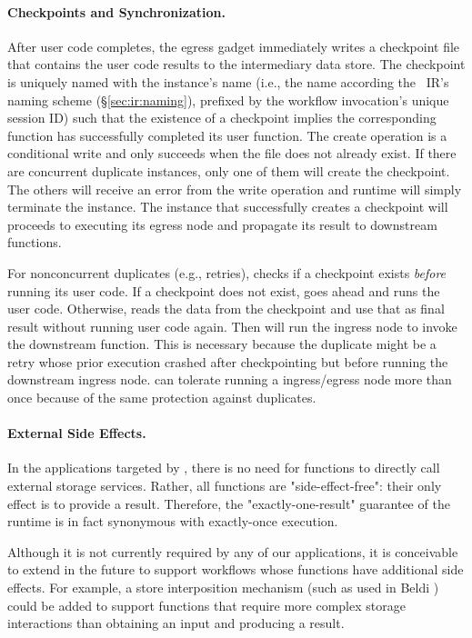 \paragraph{Checkpoints and Synchronization.}
After user code completes, the \name{} egress gadget immediately writes a checkpoint file that contains the user code
results to the intermediary data store. The checkpoint is uniquely named with
the instance's name (i.e., the name according the
\name{}~IR's naming scheme (\S\ref{sec:ir:naming}), prefixed by the workflow
invocation's unique session ID) such that the existence of a checkpoint
implies the corresponding function has successfully completed its user
function. The create operation is a conditional write and only succeeds when
the file does not already exist. If there are concurrent duplicate instances,
only one of them will create the checkpoint. The others will receive an error
from the write operation and \name{} runtime will simply terminate the
instance. The instance that successfully creates a checkpoint will proceeds to
executing its egress node and propagate its result to downstream functions.

For nonconcurrent duplicates (e.g., retries), \name{} checks if a checkpoint
exists \emph{before} running its user code. If a checkpoint does not exist,
\name{} goes ahead and runs the user code. Otherwise, \name{} reads the data
from the checkpoint and use that as final result without running user code
again. Then \name{} will run the ingress node to invoke the downstream function.
This is necessary because the duplicate might be a retry whose prior execution
crashed after checkpointing but before running the downstream ingress node. \name{} can
tolerate running a ingress/egress node more than once because of the same protection
against duplicates.

\paragraph{External Side Effects.}
In the applications targeted by \name{}, there is no need for functions to directly call external storage services. 
Rather, all functions are "side-effect-free": their only effect is to provide a result.
Therefore, the "exactly-one-result" guarantee of the \name{} runtime is in fact synonymous with exactly-once execution.

Although it is not currently required by any of our applications, it is conceivable to extend \name{} in the future to support
workflows whose functions have additional side effects. For example, a store interposition mechanism (such as used in Beldi \cite{beldi}) could 
be added to support functions that require more complex storage interactions than obtaining an input and producing a result.


